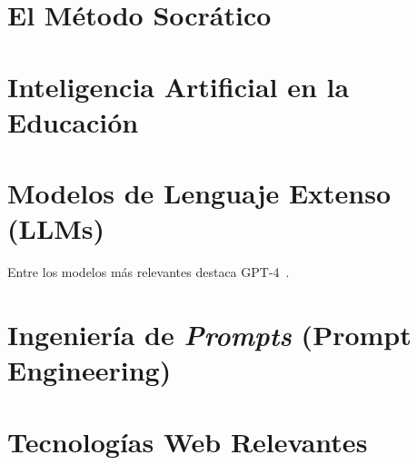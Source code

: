 
\section{El Método Socrático}


\section{Inteligencia Artificial en la Educación}


\section{Modelos de Lenguaje Extenso (LLMs)}
Entre los modelos más relevantes destaca GPT-4~\cite{openai2023gpt4}.


\section{Ingeniería de \textit{Prompts} (Prompt Engineering)}


\section{Tecnologías Web Relevantes}
